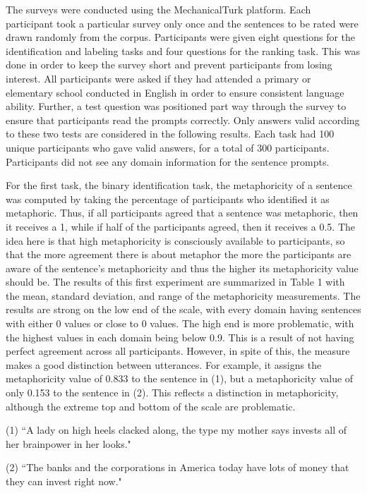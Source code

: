 \documentclass[11pt]{article}
\begin{document}
The surveys were conducted using the MechanicalTurk platform. Each participant took a particular survey only once and the sentences to be rated were drawn randomly from the corpus. Participants were given eight questions for the identification and labeling tasks and four questions for the ranking task. This was done in order to keep the survey short and prevent participants from losing interest. All participants were asked if they had attended a primary or elementary school conducted in English in order to ensure consistent language ability. Further, a test question was positioned part way through the survey to ensure that participants read the prompts correctly. Only answers valid according to these two tests are considered in the following results. Each task had 100 unique participants who gave valid answers, for a total of 300 participants. Participants did not see any domain information for the sentence prompts.

For the first task, the binary identification task, the metaphoricity of a sentence was computed by taking the percentage of participants who identified it as metaphoric. Thus, if all participants agreed that a sentence was metaphoric, then it receives a 1, while if half of the participants agreed, then it receives a 0.5. The idea here is that high metaphoricity is consciously available to participants, so that the more agreement there is about metaphor the more the participants are aware of the sentence's metaphoricity and thus the higher its metaphoricity value should be.
The results of this first experiment are summarized in Table 1 with the mean, standard deviation, and range of the metaphoricity measurements. The results are strong on the low end of the scale, with every domain having sentences with either 0 values or close to 0 values. The high end is more problematic, with the highest values in each domain being below 0.9. This is a result of not having perfect agreement across all participants. However, in spite of this, the measure makes a good distinction between utterances. For example, it assigns the metaphoricity value of 0.833 to the sentence in (1), but a metaphoricity value of only 0.153 to the sentence in (2). This reflects a distinction in metaphoricity, although the extreme top and bottom of the scale are problematic.

(1)	``A lady on high heels clacked along, the type my mother says invests all of her brainpower in her looks."

(2)	``The banks and the corporations in America today have lots of money that they can invest right now."
\end{document}
